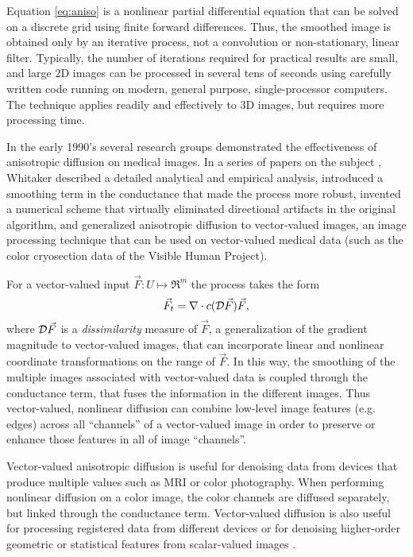 Equation \ref{eq:aniso} is a nonlinear partial differential equation that can
be solved on a discrete grid using finite forward differences.  Thus, the
smoothed image is obtained only by an iterative process, not a convolution or
non-stationary, linear filter.  Typically, the number of iterations required
for practical results are small, and large 2D images can be processed in
several tens of seconds using carefully written code running on modern, general
purpose, single-processor computers.  The technique applies readily and
effectively to 3D images, but requires more processing time.

In the early 1990's several research groups \cite{Gerig1991,Whitaker1993d}
demonstrated the effectiveness of anisotropic diffusion on medical images.  In
a series of papers on the subject
\cite{Whitaker1993,Whitaker1993b,Whitaker1993c,Whitaker1993d,Whitaker-thesis,Whitaker1994},
Whitaker described a detailed analytical and empirical analysis, introduced a
smoothing term in the conductance that made the process more robust, invented a
numerical scheme that virtually eliminated directional artifacts in the
original algorithm, and generalized anisotropic diffusion to vector-valued
images, an image processing technique that can be used on vector-valued medical
data (such as the color cryosection data of the Visible Human Project).

For a vector-valued input $\vec{F}:U \mapsto \Re^{m}$ the process takes the
form \begin{equation} \vec{F}_{t} = \nabla \cdot c({\cal D}\vec{F}) \vec{F},
\label{eq:vector_diff} \end{equation} where ${\cal D}\vec{F}$ is a {\em
dissimilarity} measure of $\vec{F}$, a generalization of the gradient magnitude
to vector-valued images, that can incorporate linear and nonlinear coordinate
transformations on the range of $\vec{F}$.  In this way, the smoothing of the
multiple images associated with vector-valued data is coupled through the
conductance term, that fuses the information in the different images.  Thus
vector-valued, nonlinear diffusion can combine low-level image features (e.g.
edges) across all ``channels'' of a vector-valued image in order to preserve or
enhance those features in all of image ``channels''.

Vector-valued anisotropic diffusion is useful for denoising data from devices
that produce multiple values such as MRI or color photography.  When performing
nonlinear diffusion on a color image, the color channels are diffused
separately, but linked through the conductance term. Vector-valued diffusion
is also useful for processing registered data from different devices or for
denoising higher-order geometric or statistical features from scalar-valued
images \cite{Whitaker1994,Yoo1993}.

